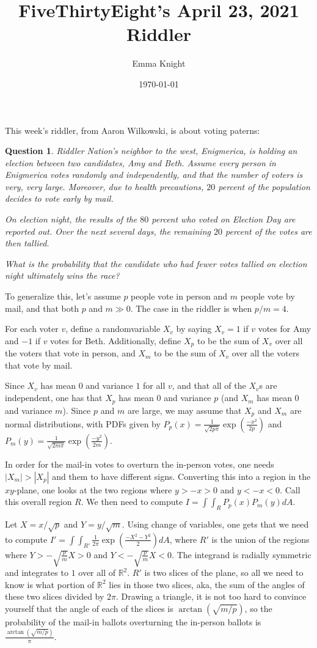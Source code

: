 \documentclass[11pt]{article}
\title{FiveThirtyEight's April 23, 2021 Riddler}
\author{Emma Knight}
\date{\today}
\newtheorem{question}[theorem]{Question}
\theoremstyle{definition}
\newcommand{\R}{\mathbb{R}}
\begin{document}
\maketitle
This week's riddler, from Aaron Wilkowski, is about voting paterns:
\begin{question}
Riddler Nation’s neighbor to the west, Enigmerica, is holding an election between two candidates, Amy and Beth. Assume every person in Enigmerica votes randomly and independently, and that the number of voters is very, very large. Moreover, due to health precautions, $20$ percent of the population decides to vote early by mail.

On election night, the results of the $80$ percent who voted on Election Day are reported out. Over the next several days, the remaining $20$ percent of the votes are then tallied.

What is the probability that the candidate who had fewer votes tallied on election night ultimately wins the race?
\end{question}
To generalize this, let's assume $p$ people vote in person and $m$ people vote by mail, and that both $p$ and $m \gg 0$.  The case in the riddler is when $p/m = 4$.

For each voter $v$, define a randomvariable $X_v$ by saying $X_v = 1$ if $v$ votes for Amy and $-1$ if $v$ votes for Beth.  Additionally, define $X_p$ to be the sum of $X_v$ over all the voters that vote in person, and $X_m$ to be the sum of $X_v$ over all the voters that vote by mail.

Since $X_v$ has mean $0$ and variance $1$ for all $v$, and that all of the $X_v$s are independent, one has that $X_p$ has mean $0$ and variance $p$ (and $X_m$ has mean $0$ and variance $m$).  Since $p$ and $m$ are large, we may assume that $X_p$ and $X_m$ are normal distributions, with PDFs given by $P_p(x) =\displaystyle{\frac{1}{\sqrt{2p\pi}}\exp\left(\frac{-x^2}{2p}\right)}$ and $P_m(y) = \displaystyle{\frac{1}{\sqrt{2m\pi}}\exp\left(\frac{-y^2}{2m}\right)}$.

In order for the mail-in votes to overturn the in-person votes, one needs $|X_m| > |X_p|$ and them to have different signs.  Converting this into a region in the $xy$-plane, one looks at the two regions where $y > -x > 0$ and $y < -x < 0$.  Call this overall region $R$.  We then need to compute $I = \int\int_R P_p(x)P_m(y)dA$.

Let $X = x/\sqrt{p}$ and $Y = y/\sqrt{m}$.  Using change of variables, one gets that we need to compute $I' = \int\int_{R'} \frac{1}{2\pi}\exp\left(\frac{-X^2-Y^2}{2}\right)dA$, where $R'$ is the union of the regions where $Y > -\sqrt{\frac{p}{m}}X > 0$ and $Y < -\sqrt{\frac{p}{m}} X < 0$.  The integrand is radially symmetric and integrates to $1$ over all of $\R^2$.  $R'$ is two slices of the plane, so all we need to know is what portion of $\R^2$ lies in those two slices, aka, the sum of the angles of these two slices divided by $2\pi$.  Drawing a triangle, it is not too hard to convince yourself that the angle of each of the slices is $\arctan\left(\sqrt{m/p}\right)$, so the probability of the mail-in ballots overturning the in-person ballots is $\frac{\arctan\left(\sqrt{m/p}\right)}{\pi}$.
\end{document}
